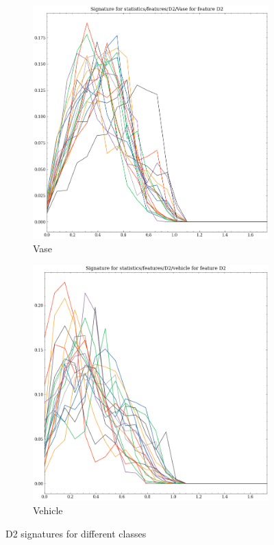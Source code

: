 \begin{figure}
    \begin{subfigure}[b]{0.23\textwidth}
        \includegraphics[width=\textwidth]{assets/feature_extraction/D2/Vase.png}
        \caption{Vase}
    \end{subfigure}
    \hfill
    \begin{subfigure}[b]{0.23\textwidth}
        \includegraphics[width=\textwidth]{assets/feature_extraction/D2/vehicle.png}
        \caption{Vehicle}
    \end{subfigure}
    \hfill
    
    \caption{D2 signatures for different classes}
    \label{fig:D2-signatures-2}
\end{figure}

